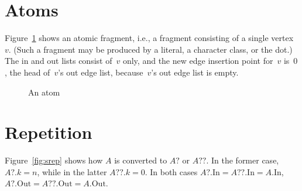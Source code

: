 \documentclass{article}
\newcommand*{\In}{\mathrm{In}}
\newcommand*{\Out}{\mathrm{Out}}
\begin{document}
\section{Atoms}

Figure~\ref{fig:atom} shows an atomic fragment, i.e., a fragment consisting of a single vertex~$v$. (Such a fragment may be produced by a literal, a character class, or the dot.) The in and out lists consist of~$v$ only, and the new edge insertion point for~$v$ is~$0$, the head of~$v$'s out edge list, because~$v$'s out edge list is empty.

\begin{figure}
\centering
{}
\caption{An atom\label{fig:atom}}
\end{figure}

\section{Repetition}

Figure~\ref{fig:srep} shows how $A$ is converted to $A?$ or $A??$. In the former case, $A?.k = n$, while in the latter $A??.k = 0$. In both cases $A?.\In = A??.\In = A.\In$, $A?.\Out = A??.\Out = A.\Out$.
\end{document}
